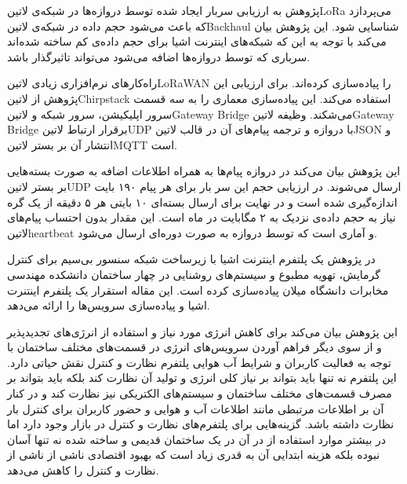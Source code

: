 

پژوهش  به ارزیابی سربار ایجاد شده توسط دروازه‌ها در شبکه‌ی ‌لاتین{LoRa}
می‌پردازد که باعث می‌شود حجم داده در شبکه‌ی ‌لاتین{Backhaul} شناسایی شود.
این پژوهش بیان می‌کند با توجه به این که شبکه‌های اینترنت اشیا برای حجم داده‌ی کم ساخته شده‌اند سرباری که توسط دروازه‌ها
اضافه می‌شود می‌تواند تاثیرگذار باشد.

راه‌کارهای نرم‌افزاری زیادی ‌لاتین{LoRaWAN} را پیاده‌سازی کرده‌اند.
برای ارزیابی این پژوهش از ‌لاتین{Chirpstack} استفاده می‌کند.
این پیاده‌سازی معماری را به سه قسمت سرور اپلیکیشن، سرور شبکه و ‌لاتین{Gateway Bridge}
می‌شکند.
وظیفه ‌لاتین{Gateway Bridge} برقرار ارتباط ‌لاتین{UDP} با دروازه و ترجمه پیام‌های آن در قالب
‌لاتین{JSON} و انتشار آن بر بستر ‌لاتین{MQTT} است.

این پژوهش بیان می‌کند در دروازه پیام‌ها به همراه اطلاعات اضافه به صورت بسته‌هایی بر بستر ‌لاتین{UDP} ارسال می‌شوند.
در ارزیابی حجم این سر بار برای هر پیام ۱۹۰ بایت اندازه‌گیری شده است و در نهایت برای ارسال بسته‌ای ۱۰ بایتی هر ۵ دقیقه از یک گره نیاز به
حجم داده‌ی نزدیک به ۲ مگابایت در ماه است. این مقدار بدون احتساب پیام‌های ‌لاتین{heartbeat} و آماری است که توسط دروازه
به صورت دوره‌ای ارسال می‌شود.



در پژوهش  یک پلتفرم اینترنت اشیا با زیرساخت شبکه سنسور بی‌سیم برای کنترل گرمایش، تهویه مطبوع و سیستم‌های روشنایی در چهار ساختمان دانشکده
مهندسی مخابرات دانشگاه میلان پیاده‌سازی کرده است. این مقاله استقرار یک پلتفرم اینتنرت اشیا و پیاده‌سازی سرویس‌ها را ارائه می‌دهد.

این پژوهش بیان می‌کند برای کاهش انرژی مورد نیاز و استفاده از انرژی‌های تجدیدپذیر و از سوی دیگر فراهم آوردن سرویس‌های انرژی در قسمت‌های مختلف ساختمان با توجه به فعالیت
کاربران و شرایط آب هوایی پلتفرم نظارت و کنترل نقش حیاتی دارد. این پلتفرم نه تنها باید بتواند بر نیاز کلی انرژی و تولید آن نظارت کند بلکه باید بتواند بر مصرف قسمت‌های مختلف ساختمان
و سیستم‌های الکتریکی نیز نظارت کند و در کنار آن بر اطلاعات مرتبطی مانند اطلاعات آب و هوایی و حضور کاربران برای کنترل بار نظارت داشته باشد.
گزینه‌هایی برای پلتفرم‌های نظارت و کنترل در بازار وجود دارد اما در بیشتر موارد استفاده از در آن در یک ساختمان قدیمی و ساخته شده نه تنها آسان نبوده بلکه هزینه ابتدایی آن به قدری زیاد است
که بهبود اقتصادی ناشی از ناشی از نظارت و کنترل را کاهش می‌دهد.

